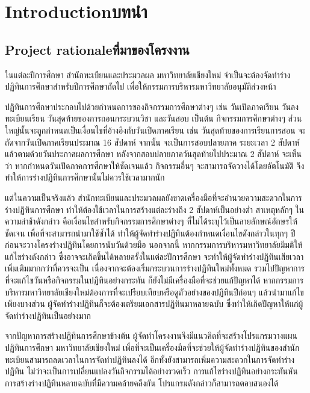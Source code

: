 \chapter{\ifenglish Introduction\else บทนำ\fi}

\section{\ifenglish Project rationale\else ที่มาของโครงงาน\fi}
ในแต่ละปีการศึกษา สำนักทะเบียนและประมวลผล มหาวิทยาลัยเชียงใหม่ จำเป็นจะต้องจัดทำร่างปฏิทินการศึกษาสำหรับปีการศึกษาถัดไป เพื่อให้กรรมการบริหารมหาวิทยาลัยอนุมัติล่วงหน้า

ปฏิทินการศึกษาประกอบไปด้วยกำหนดการของกิจกรรมการศึกษาต่างๆ เช่น วันเปิดภาคเรียน วันลงทะเบียนเรียน วันสุดท้ายของการถอนกระบวนวิชา และวันสอบ เป็นต้น
%
กิจกรรมการศึกษาต่างๆ ส่วนใหญ่นั้นจะถูกกำหนดเป็นเงื่อนไขที่อ้างอิงกับวันเปิดภาคเรียน เช่น วันสุดท้ายของการเรียนการสอน จะถัดจากวันเปิดภาคเรียนประมาณ 16 สัปดาห์ จากนั้น จะเป็นการสอบปลายภาค ระยะเวลา 2 สัปดาห์ แล้วตามด้วยวันประกาศผลการศึกษา หลังจากสอบปลายภาควันสุดท้ายไปประมาณ 2 สัปดาห์
%
จะเห็นว่า หากกำหนดวันเปิดภาคการศึกษาให้ชัดเจนแล้ว กิจกรรมอื่นๆ จะสามารถจัดวางได้โดยอัตโนมัติ จึงทำให้การร่างปฏิทินการศึกษานั้นไม่ควรใช้เวลามากนัก

แต่ในความเป็นจริงแล้ว สำนักทะเบียนและประมวลผลยังขาดเครื่องมือที่จะอำนวยความสะดวกในการร่างปฏิทินการศึกษา ทำให้ต้องใช้เวลาในการสร้างแต่ละร่างถึง 2 สัปดาห์เป็นอย่างต่ำ
%
สาเหตุหลักๆ ในความล่าช้าดังกล่าว คือเงื่อนไขสำหรับกิจกรรมการศึกษาต่างๆ ที่ไม่ได้ระบุไว้เป็นลายลักษณ์อักษรให้ชัดเจน เพื่อที่จะสามารถนำมาใช้ซ้ำได้ ทำให้ผู้จัดทำร่างปฏิทินต้องกำหนดเงื่อนไขดังกล่าวในทุกๆ ปี ก่อนจะวางโครงร่างปฏิทินโดยการนับวันด้วยมือ
%
นอกจากนี้ หากกรรมการบริหารมหาวิทยาลัยมีมติให้แก้ไขร่างดังกล่าว ซึ่งอาจจะเกิดขึ้นได้หลายครั้งในแต่ละปีการศึกษา จะทำให้ผู้จัดทำร่างปฏิทินเสียเวลาเพิ่มเติมมากกว่าที่ควรจะเป็น เนื่องจากจะต้องเริ่มกระบวนการร่างปฏิทินใหม่ทั้งหมด
%
รวมไปปัญหาการที่จะแก้ไขวันหรือกิจกรรมในปฏิทินอย่างกระทัน ก็ยังไม่มีเครื่องมือที่จะช่วยแก้ปัญหาได้ หากกรรมการบริหารมหาวิทยาลัยเชียงใหม่ต้องการที่จะเปรียบเทียบหรือดูตัวอย่างของปฏิทินปีก่อนๆ แล้วนำมาแก้ไขเพียงบางส่วน ผู้จัดทำร่างปฏิทินก็จะต้องเตรียมเอกสารปฏิทินมาหลายฉบับ ซึ่งทำให้เกิดปัญหาให้แก่ผู้จัดทำร่างปฏิทินเป็นอย่างมาก

จากปัญหาการสร้างปฏิทินการศึกษาข้างต้น ผู้จัดทำโครงงานจึงมีแนวคิดที่จะสร้างโปรแกรมวางแผนปฏิทินการศึกษา มหาวิทยาลัยเชียงใหม่  
%
เพื่อที่จะเป็นเครื่องมือที่จะช่วยให้ผู้จัดทำร่างปฏิทินของสำนักทะเบียนสามารถลดเวลาในการจัดทำปฏิทินลงได้
%
อีกทั้งยังสามารถเพิ่มความสะดวกในการจัดทำร่างปฏิทิน ไม่ว่าจะเป็นการเปลี่ยนแปลงวันกิจกรรมได้อย่างรวดเร็ว การแก้ไขร่างปฏิทินอย่างกระทันหัน การสร้างร่างปฏิทินหลายฉบับที่มีความคล้ายคลึงกัน โปรแกรมดังกล่าวก็สามารถตอบสนองได้ 

